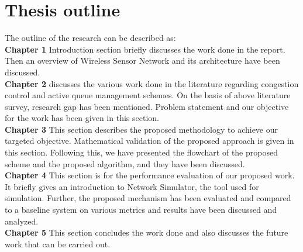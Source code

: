 \section{Thesis outline}
The outline of the research can be described as:\\
\textbf{Chapter 1} Introduction section briefly discusses the work done in the report. Then an overview of Wireless Sensor Network and its architecture have been discussed.
\\
\textbf{Chapter 2} discusses the various work done in the literature regarding congestion control and active queue management schemes. On the basis of above literature survey, research gap has been mentioned. Problem statement and our objective for the work has been given in this section.
\\
\textbf{Chapter 3} This section describes the proposed methodology to achieve our targeted objective. Mathematical validation  of the proposed approach is given in this section. Following this, we have presented the flowchart of the proposed scheme and the proposed algorithm, and they have been discussed. 
\\
\textbf{Chapter 4} This section is for the performance evaluation of our proposed work. It briefly gives an introduction to Network Simulator, the tool used for simulation. Further, the proposed mechanism has been evaluated and compared to a baseline system on various metrics and results have been discussed and analyzed.
\\
\textbf{Chapter 5} This section concludes the work done and also discusses the future work that can be carried out. 


